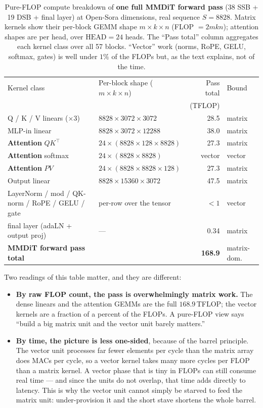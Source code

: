 \documentclass[11pt]{report}
\begin{document}
\begin{table}[t]
\centering
\caption{Pure-FLOP compute breakdown of \textbf{one full MMDiT forward pass}
(38 SSB + 19 DSB + final layer) at Open-Sora dimensions, real sequence
$S=8828$. Matrix kernels show their per-block GEMM shape $m\times k\times n$
(FLOP $=2mkn$); attention shapes are per head, over $\text{HEAD}=24$ heads.
The ``Pass total'' column aggregates each kernel class over all 57 blocks.
``Vector'' work (norms, RoPE, GELU, softmax, gates) is well under $1\%$ of
the FLOPs but, as the text explains, not of the time.}
\label{tab:compute-balance}
\begin{tabular}{@{}llrl@{}}
\toprule
Kernel class & Per-block shape ($m{\times}k{\times}n$) & Pass total & Bound \\
 & & (TFLOP) & \\
\midrule
Q / K / V linears ($\times3$) & $8828\times3072\times3072$ & 28.5 & matrix \\
MLP-in linear & $8828\times3072\times12288$ & 38.0 & matrix \\
\textbf{Attention} $QK^\top$ & $24\times(8828{\times}128{\times}8828)$ & 27.3 & matrix \\
\textbf{Attention} softmax & $24\times(8828{\times}8828)$ & vector & vector \\
\textbf{Attention} $PV$ & $24\times(8828{\times}8828{\times}128)$ & 27.3 & matrix \\
Output linear & $8828\times15360\times3072$ & 47.5 & matrix \\
LayerNorm / mod / QK-norm / RoPE / GELU / gate & per-row over the tensor & $<1$ & vector \\
final layer (adaLN + output proj) & --- & 0.34 & matrix \\
\midrule
\textbf{MMDiT forward pass total} & & \textbf{168.9} & matrix-dom. \\
\bottomrule
\end{tabular}
\end{table}

Two readings of this table matter, and they are different:

\begin{itemize}
\item \textbf{By raw FLOP count, the pass is overwhelmingly matrix work.}
The dense linears and the attention GEMMs are the full $168.9$\,TFLOP; the
vector kernels are a fraction of a percent of the FLOPs. A pure-FLOP view
says ``build a big matrix unit and the vector unit barely matters.''
\item \textbf{By time, the picture is less one-sided}, because of the
barrel principle. The vector unit processes far fewer elements per cycle
than the matrix array does MACs per cycle, so a vector kernel takes many
more cycles per FLOP than a matrix kernel. A vector phase that is tiny in
FLOPs can still consume real time --- and since the units do not overlap,
that time adds directly to latency. This is why the vector
unit cannot simply be starved to feed the matrix unit: under-provision it
and the short stave shortens the whole barrel.
\end{itemize}
\end{document}
